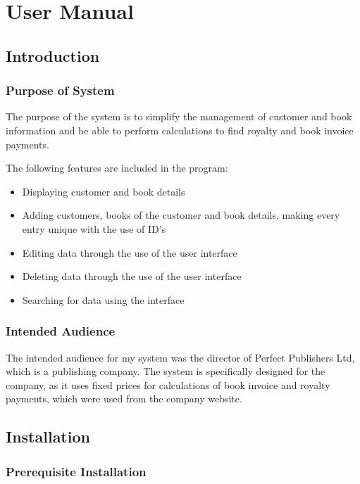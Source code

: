\chapter{User Manual}

\tableofcontents
\startcontents[chapters]

\section{Introduction}

\subsection{Purpose of System}

The purpose of the system is to simplify the management of customer and book information and be able to perform calculations to find royalty and book invoice payments.

The following features are included in the program:

\begin{itemize}
    \item Displaying customer and book details
    \item Adding customers, books of the customer and book details, making every entry unique with the use of ID's
    \item Editing data through the use of the user interface
    \item Deleting data through the use of the user interface
    \item Searching for data using the interface
\end{itemize}

\subsection{Intended Audience}
The intended audience for my system was the director of Perfect Publishers Ltd, which is a publishing company. The system is specifically designed for the company, as it uses fixed prices for calculations of book invoice and royalty payments, which were used from the company website.


\section{Installation}

\subsection{Prerequisite Installation}

